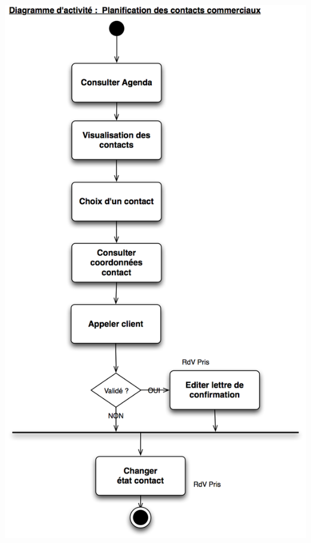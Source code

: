 \begin {center}
\includegraphics[width=\textwidth]{../../diagrammeActivite/DACU6.png}

\end{center}
